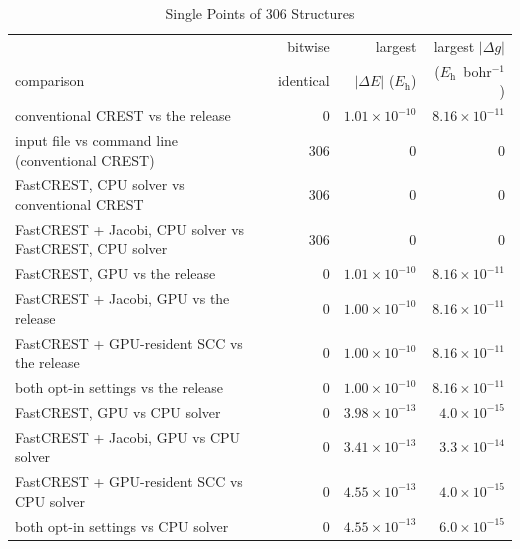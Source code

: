 \documentclass[journal=jctcce,manuscript=suppinfo]{achemso}
\newcommand{\Eh}{\ensuremath{E_\mathrm{h}}}
\begin{document}
\begin{table}[tbp]
\caption{Single Points of 306 Structures}
\label{tab:si-sp}
\small
\begin{tabular}{@{}L{0.46\textwidth}rrr@{}}
\toprule
 & bitwise & largest & largest $|\Delta g|$ \\
comparison & identical & $|\Delta E|$ (\Eh) & (\Eh~bohr$^{-1}$) \\
\midrule
conventional CREST vs the release & 0 & $1.01\times10^{-10}$ & $8.16\times10^{-11}$ \\
input file vs command line (conventional CREST) & 306 & 0 & 0 \\
FastCREST, CPU solver vs conventional CREST & 306 & 0 & 0 \\
FastCREST + Jacobi, CPU solver vs FastCREST, CPU solver & 306 & 0 & 0 \\
FastCREST, GPU vs the release & 0 & $1.01\times10^{-10}$ & $8.16\times10^{-11}$ \\
FastCREST + Jacobi, GPU vs the release & 0 & $1.00\times10^{-10}$ & $8.16\times10^{-11}$ \\
FastCREST + GPU-resident SCC vs the release & 0 & $1.00\times10^{-10}$ & $8.16\times10^{-11}$ \\
both opt-in settings vs the release & 0 & $1.00\times10^{-10}$ & $8.16\times10^{-11}$ \\
FastCREST, GPU vs CPU solver & 0 & $3.98\times10^{-13}$ & $4.0\times10^{-15}$ \\
FastCREST + Jacobi, GPU vs CPU solver & 0 & $3.41\times10^{-13}$ & $3.3\times10^{-14}$ \\
FastCREST + GPU-resident SCC vs CPU solver & 0 & $4.55\times10^{-13}$ & $4.0\times10^{-15}$ \\
both opt-in settings vs CPU solver & 0 & $4.55\times10^{-13}$ & $6.0\times10^{-15}$ \\
\bottomrule
\end{tabular}
\end{table}
\end{document}
